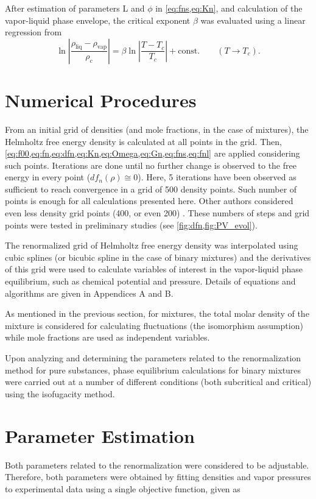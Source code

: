 \documentclass[preprint,12pt,3p]{elsarticle}
\begin{document}
After estimation of parameters L and $\phi$ in \cref{eq:fns,eq:Kn}, and calculation of the vapor-liquid phase envelope, the critical exponent $\beta$ was evaluated using a linear regression from
\begin{equation} \label{eq:beta_law}
\ln\left|\frac{\rho_\text{liq}-\rho_\text{vap}}{\rho_{c}}\right| = \beta \ln\left|\frac{T-T_{c}}{T_{c}}\right|+\text{const.} \qquad (T \rightarrow T_{c}).
\end{equation}

\section{Numerical Procedures}
From an initial grid of densities (and mole fractions, in the case of mixtures), the Helmholtz free energy density is calculated at all points in the grid.
Then, \cref{eq:f00,eq:fn,eq:dfn,eq:Kn,eq:Omega,eq:Gn,eq:fns,eq:fnl} are applied considering such points.
Iterations are done until no further change is observed to the free energy in every point ($df_{n}(\rho) \cong 0$).
Here, 5 iterations have been observed as sufficient to reach convergence in a grid of 500 density points.
Such number of points is enough for all calculations presented here.
Other authors considered even less density grid points (400, or even 200) \cite{cai2004thermodynamics}.
These numbers of steps and grid points were tested in preliminary studies (see \cref{fig:dfn,fig:PV_evol}).

The renormalized grid of Helmholtz free energy density was interpolated using cubic splines (or bicubic spline in the case of binary mixtures) and the derivatives of this grid were used to calculate variables of interest in the vapor-liquid phase equilibrium, such as chemical potential and pressure.
Details of equations and algorithms are given in Appendices A and B.

As mentioned in the previous section, for mixtures, the total molar density of the mixture is considered for calculating fluctuations (the isomorphism assumption) while mole fractions are used as independent variables.

Upon analyzing and determining the parameters related to the renormalization method for pure substances, phase equilibrium calculations for binary mixtures were carried out at a number of different conditions (both subcritical and critical) using the isofugacity method.

\section{Parameter Estimation}
Both parameters related to the renormalization were considered to be adjustable.
Therefore, both parameters were obtained by fitting densities and vapor pressures to experimental data using a single objective function, given as
\end{document}
